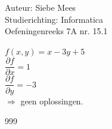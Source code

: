 \documentclass[a4paper]{article}
\begin{document}
  
\noindent \large Auteur: Siebe Mees \\
\noindent \large Studierichting: Informatica\\
\noindent \large Oefeningenreeks 7A nr. 15.1\\

\medskip

\normalsize

$f(x,y)=x-3y+5$\\

$\dfrac{\partial f}{\partial x}=1$\\

$\dfrac{\partial f}{\partial y}=-3$\\

$\Rightarrow$ geen oplossingen.\\

\begin{thebibliography}{999}
\end{thebibliography}
\end{document}
